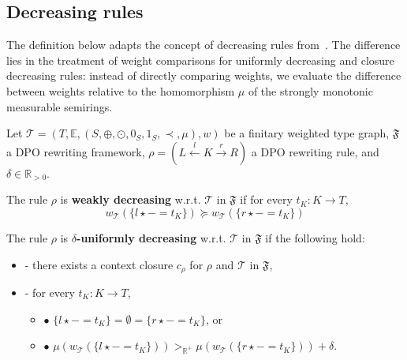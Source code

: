 
        
\subsection{Decreasing rules}
\label{nwf:sec:decreasing_rules}
The definition below adapts the concept of decreasing rules from~\cite{endrullis2024generalized_arxiv_v2}. The difference lies in the treatment of weight comparisons for uniformly decreasing and closure decreasing rules: instead of directly comparing weights, we evaluate the difference between weights relative to the homomorphism $\mu$ of the strongly monotonic measurable semirings.

\begin{definition}
    \label{nwf:def:decreasing_rule}
    Let $\mathcal{T} = (T,\mathbb{E}, (S, \oplus, \odot, 0_S, 1_S, \prec, \mu), w)$ be a finitary weighted type graph, \(\mathfrak{F}\) a DPO rewriting framework, $\rho = (L \overset{l}{\leftarrow} K \overset{r}{\rightarrow} R)$ a DPO rewriting rule, and $\delta \in \mathbb{R}_{>0}$. 

    \noindent
    The rule $\rho$ is \textbf{weakly decreasing} w.r.t. $\mathcal{T}$ in $\mathfrak{F}$ if 
            for every $t_K : K \to T$,
                $$ 
                  w_\mathcal{T}(\{l \star - = t_K\}) \succeq w_\mathcal{T}(\{r\star - = t_K\})$$
           
    \noindent
    The rule $\rho$ is \textbf{$\delta$-uniformly decreasing} w.r.t. $\mathcal{T}$ in $\mathfrak{F}$ if the following hold:
        \begin{itemize}
            \item[]- there exists a context closure $c_\rho$ for $\rho$ and $\mathcal{T}$ in $\mathfrak{F}$, 
            \item[]- for every $t_K : K \to T$,
            \begin{itemize}
                \item[] $\bullet$ $\{l \star - = t_K\} = \emptyset = \{r \star - = t_K\}$, or
                \item[] $\bullet$ $\mu(w_\mathcal{T}(\{l \star - = t_K\}))  >_{\mathbb{R}^+}   \mu(w_\mathcal{T}(\{r \star - = t_K\})) + \delta$.
            \end{itemize}
        \end{itemize}  
         

\end{definition}

